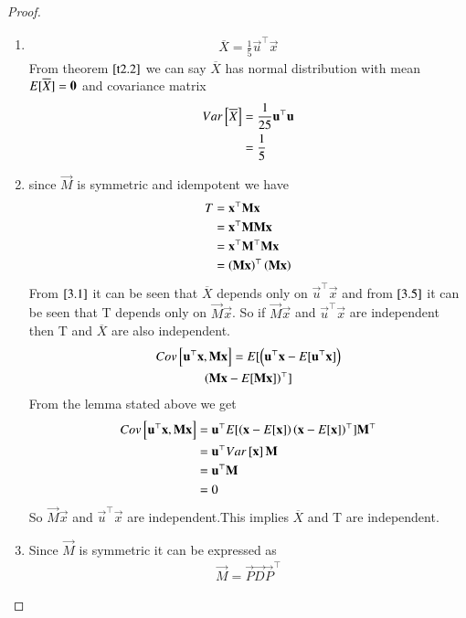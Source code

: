 \documentclass[journal,12pt,twocolumn]{IEEEtran}
\begin{document}
\begin{proof}
\begin{enumerate}
\item 
\begin{align}
    \overline{X}=\frac{1}{5}\vec{u}^{\top}\vec{x}\label{3.1}
\end{align}
From theorem $\ref{t2.2}$ we can say $\overline{X}$ has normal distribution with mean $E[ \overline{X} ]=\mathbf{0}$ and covariance matrix
\begin{align}
    Var{}\left[\overline{X}\right]&=\frac{1}{25}\mathbf{u}^{\top}\mathbf{u}\\
    &=\frac{1}{5}
\end{align}
\item since $\vec{M}$ is symmetric and idempotent we have
\begin{align}
   T&=\mathbf{x}^{\top}\mathbf{M}\mathbf{x}\\
    &=\mathbf{x}^{\top}\mathbf{M}\mathbf{M}\mathbf{x}\\
    &=\mathbf{x}^{\top}\mathbf{M}^{\top}\mathbf{M}\mathbf{x}\\
    &=\left(\mathbf{M}\mathbf{x}\right)^{\top}\left(\mathbf{M}\mathbf{x}\right)\label{3.5} 
\end{align}
From $\eqref{3.1}$ it can be seen that $\overline{X}$ depends only on $\vec{u}^{\top}\vec{x}$ and from $\eqref{3.5}$ it can be seen that T depends only on $\vec{M}\vec{x}$.
So if $\vec{M}\vec{x}$ and $\vec{u}^{\top}\vec{x}$ are independent then T and $\overline{X}$  are also independent.
\begin{multline}
    Cov{}\left[\mathbf{u}^{\top}\mathbf{x},\mathbf{M}\mathbf{x}\right]=E[ \left(\mathbf{u}^{\top}\mathbf{x}-E[ \mathbf{u}^{\top}\mathbf{x} ]\right)\\\left(\mathbf{M}\mathbf{x}-E[ \mathbf{M}\mathbf{x} ]\right)^{\top} ]
\end{multline}
From the lemma stated above we get
\begin{align}
 Cov{}\left[\mathbf{u}^{\top}\mathbf{x},\mathbf{M}\mathbf{x}\right]   &=\mathbf{u}^{\top}E[ \left(\mathbf{x}-E[ \mathbf{x} ]\right)\left(\mathbf{x}-E[ \mathbf{x} ]\right)^{\top} ]\mathbf{M}^{\top}\\
    &=\mathbf{u}^{\top}Var{}\left[\mathbf{x}\right]\mathbf{M}\\
    &=\mathbf{u}^{\top}\mathbf{M}\\
    &=0
\end{align}
So $\vec{M}\vec{x}$ and $\vec{u}^{\top}\vec{x}$ are independent.This implies $\overline{X}$ and T are independent.
\item Since $\vec{M}$ is symmetric it can be expressed as
\begin{align}
    \vec{M}=\vec{P}\vec{D}\vec{P}^{\top}

\end{align}
\end{enumerate}
\end{proof}
\end{document}
